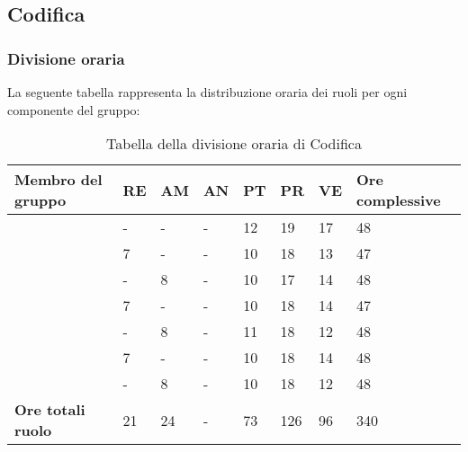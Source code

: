 \subsection{Codifica}

\subsubsection{Divisione oraria}
La seguente tabella rappresenta la distribuzione oraria dei ruoli per ogni componente del gruppo:
{
	\renewcommand{\arraystretch}{2}
	\begin{longtable}[h!] { C{4cm} C{1cm} C{1cm} C{1cm} C{1cm} C{1cm} C{1cm} C{3cm}}
	\caption{Tabella della divisione oraria di Codifica}\\
	\rowcolor{\primaryColor}
	
	\textcolor{\secondaryColor}{\textbf{Membro del gruppo}} & 
	\textcolor{\secondaryColor}{\textbf{RE}} & 
	\textcolor{\secondaryColor}{\textbf{AM}} & 
	\textcolor{\secondaryColor}{\textbf{AN}} & 
	\textcolor{\secondaryColor}{\textbf{PT}} & 
	\textcolor{\secondaryColor}{\textbf{PR}} & 
	\textcolor{\secondaryColor}{\textbf{VE}} & 
	\textcolor{\secondaryColor}{\textbf{Ore complessive}}\\	
	\endhead
	
	\AW{}                     &  - & - & - & 12 & 19 & 17 & 48 \\
	\AT{}                     & 7 & - & - & 10 & 18 & 13 & 47 \\
	\AD{}                     & - & 8 & - & 10 & 17 & 14 & 48 \\
	\EC{}                     & 7 & - & - & 10 & 18 & 14 & 47 \\
	\EM{}                     & - & 8 & - & 11 & 18 & 12 & 48 \\
	\FP{}                     & 7 & - & - & 10 & 18 & 14 & 48 \\
	\GG{}                     & - & 8 & - & 10 & 18 & 12 & 48 \\
	\textbf{Ore totali ruolo} & 21 & 24 & - & 73 & 126 & 96 & 340\\
	
	\end{longtable}
}

